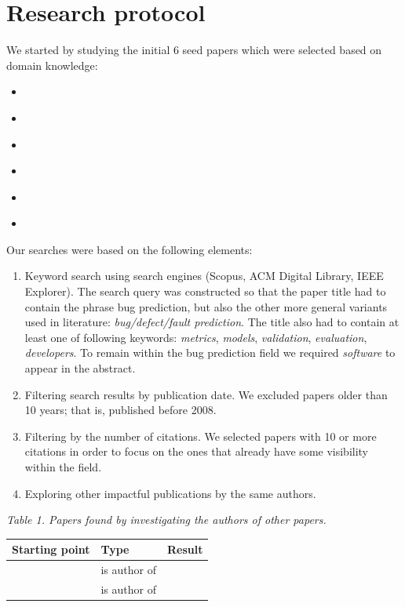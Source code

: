 \documentclass[]{book}
\providecommand{\tightlist}{%
  \setlength{\itemsep}{0pt}\setlength{\parskip}{0pt}}
\begin{document}
\section{Research protocol}\label{research-protocol-1}

We started by studying the initial 6 seed papers which were selected
based on domain knowledge:

\begin{itemize}
\tightlist
\item
  \citet{Gyimothy2005}
\item
  \citet{Catal2009review}
\item
  \citet{Arisholm2010}
\item
  \citet{DAmbros2010}
\item
  \citet{Hall2012}
\item
  \citet{Lewis2013}
\end{itemize}

Our searches were based on the following elements:

\begin{enumerate}
\def\labelenumi{\arabic{enumi}.}
\item
  Keyword search using search engines (Scopus, ACM Digital Library, IEEE
  Explorer). The search query was constructed so that the paper title
  had to contain the phrase bug prediction, but also the other more
  general variants used in literature: \emph{bug/defect/fault
  prediction}. The title also had to contain at least one of following
  keywords: \emph{metrics}, \emph{models}, \emph{validation},
  \emph{evaluation}, \emph{developers}. To remain within the bug
  prediction field we required \emph{software} to appear in the
  abstract.
\item
  Filtering search results by publication date. We excluded papers older
  than 10 years; that is, published before 2008.
\item
  Filtering by the number of citations. We selected papers with 10 or
  more citations in order to focus on the ones that already have some
  visibility within the field.
\item
  Exploring other impactful publications by the same authors.
\end{enumerate}

\emph{Table 1. Papers found by investigating the authors of other
papers.}

\begin{longtable}[]{@{}lll@{}}
\toprule
Starting point & Type & Result\tabularnewline
\midrule
\endhead
\citet{DAmbros2010} & is author of & \citet{DAmbros2012}\tabularnewline
\citet{Catal2009review} & is author of & \citet{Catal2011}
\citet{Catal2009investigating}\tabularnewline
\bottomrule
\end{longtable}
\end{document}

